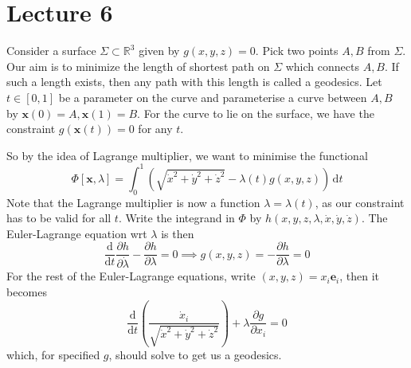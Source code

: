 \documentclass[a4paper]{article}
\begin{document}
\part*{Lecture 6}
\begin{example}
    Consider a surface $\Sigma\subset\mathbb R^3$ given by $g(x,y,z)=0$.
    Pick two points $A,B$ from $\Sigma$.
    Our aim is to minimize the length of shortest path on $\Sigma$ which connects $A,B$.
    If such a length exists, then any path with this length is called a geodesics.
    Let $t\in[0,1]$ be a parameter on the curve and parameterise a curve between $A,B$ by $\mathbf{x}(0)=A,\mathbf{x}(1)=B$.
    For the curve to lie on the surface, we have the constraint $g(\mathbf{x}(t))=0$ for any $t$.

    So by the idea of Lagrange multiplier, we want to minimise the functional
    $$\Phi[\mathbf{x},\lambda]=\int_0^1\left( \sqrt{\dot{x}^2+\dot{y}^2+\dot{z}^2} -\lambda(t) g(x,y,z)\right)\,\mathrm dt$$
    Note that the Lagrange multiplier is now a function $\lambda=\lambda(t)$, as our constraint has to be valid for all $t$.
    Write the integrand in $\Phi$ by $h(x,y,z,\lambda,\dot{x},\dot{y},\dot{z})$.
    The Euler-Lagrange equation wrt $\lambda$ is then
    $$\frac{\mathrm d}{\mathrm dt}\frac{\partial h}{\partial \dot{\lambda}}-\frac{\partial h}{\partial\lambda}=0\implies g(x,y,z)=-\frac{\partial h}{\partial\lambda}=0$$
    For the rest of the Euler-Lagrange equations, write $(x,y,z)=x_i\mathbf{e}_i$, then it becomes
    $$\frac{\mathrm d}{\mathrm dt}\left( \frac{\dot{x}_i}{\sqrt{\dot{x}^2+\dot{y}^2+\dot{z}^2}} \right)+\lambda\frac{\partial g}{\partial x_i}=0$$
    which, for specified $g$, should solve to get us a geodesics.
\end{example}
\end{document}
